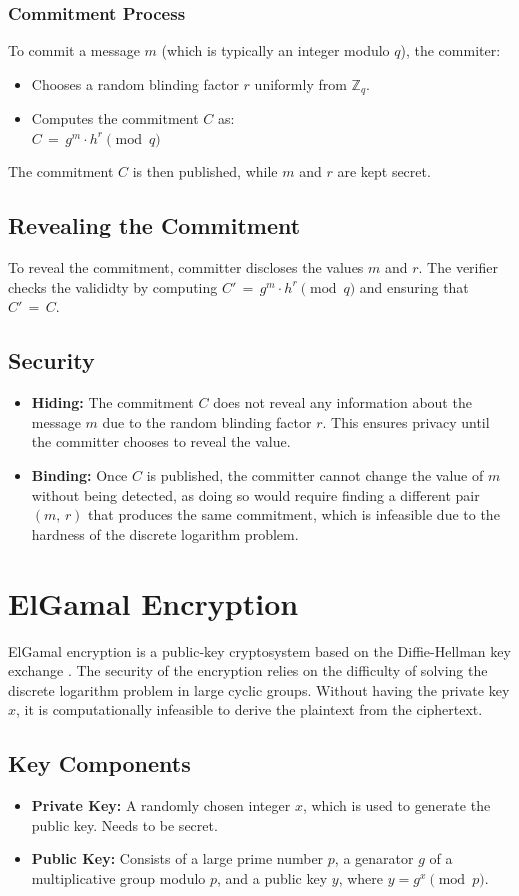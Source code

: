 \documentclass[12pt,a4paper]{report}
\begin{document}
\subsubsection{Commitment Process}
To commit a message $m$ (which is typically an integer modulo $q$), the commiter:
\begin{itemize}
	\item Chooses a random blinding factor $r$ uniformly from $\mathbb{Z}_q$.
	\item Computes the commitment $C$ as:\\ $C\,=\,g^m \cdot h^r \pmod q$
\end{itemize}
The commitment $C$ is then published, while $m$ and $r$ are kept secret.
\subsection*{Revealing the Commitment}
To reveal the commitment, committer discloses the values $m$ and $r$. 
The verifier checks the valididty by computing $C'\,=\,g^m \cdot h^r \pmod q$ and ensuring that $C'\,=\,C$.
\subsection*{Security}
\begin{itemize}
	\item \textbf{Hiding:} The commitment $C$ does not reveal any information about the message $m$ due to the random blinding factor $r$. This ensures privacy until the committer chooses to reveal the value.
	\item \textbf{Binding:} Once $C$ is published, the committer cannot change the value of $m$ without being detected, as doing so would require finding a different pair $(m,\,r)$ that produces the same commitment, which is infeasible due to the hardness of the discrete logarithm problem.
\end{itemize}
\section{ElGamal Encryption}
ElGamal encryption is a public-key cryptosystem based on the Diffie-Hellman key exchange \cite{elgamal}. The security of the encryption relies on the difficulty of solving the discrete logarithm problem in large cyclic groups. Without having the private key $x$, it is computationally infeasible to derive the plaintext from the ciphertext.
\subsection*{Key Components}
\begin{itemize}
	\item \textbf{Private Key:} A randomly chosen integer $x$, which is used to generate the public key. Needs to be secret.
	\item \textbf{Public Key:} Consists of a large prime number $p$, a genarator $g$ of a multiplicative group modulo $p$, and a public key $y$, where $y = g^x \pmod p$.
\end{itemize}
\end{document}
